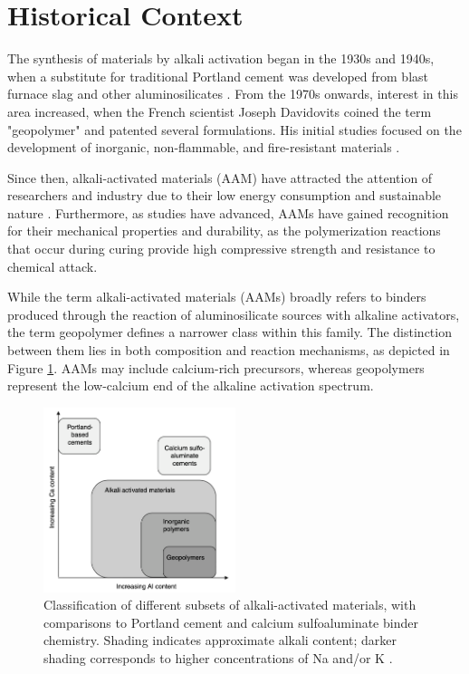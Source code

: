 \section{Historical Context}

The synthesis of materials by alkali activation began in the 1930s and 1940s, when a substitute for traditional Portland cement was developed from blast furnace slag and other aluminosilicates \cite{pachecotorgal2014handbook}.
From the 1970s onwards, interest in this area increased, when the French scientist Joseph Davidovits coined the term "geopolymer" and patented several formulations. His initial studies focused on the development of inorganic, non-flammable, and fire-resistant materials \cite{provis2009geopolymers}.


Since then, alkali-activated materials (AAM) have attracted the attention of researchers and industry due to their low energy consumption and sustainable nature \cite{qin2022onepart}.
Furthermore, as studies have advanced, AAMs have gained recognition for their mechanical properties and durability, as the polymerization reactions that occur during curing provide high compressive strength and resistance to chemical attack.


While the term alkali-activated materials (AAMs) broadly refers to binders produced through the reaction of aluminosilicate sources with alkaline activators, the term geopolymer defines a narrower class within this family.
The distinction between them lies in both composition and reaction mechanisms, as depicted in Figure \ref{fig:al_ca_aam}.
AAMs may include calcium-rich precursors, whereas geopolymers represent the low-calcium end of the alkaline activation spectrum.

\begin{figure}[H]
  \centering
  \includegraphics[width=0.5\textwidth]{Cap2/al_ca_aam.png}
  \caption{Classification of different subsets of alkali-activated
materials, with comparisons to Portland cement and
calcium sulfoaluminate binder chemistry. Shading
indicates approximate alkali content; darker shading
corresponds to higher concentrations of Na and/or K \cite{rakhimova2019reaction}.}
  \label{fig:al_ca_aam}
\end{figure}


